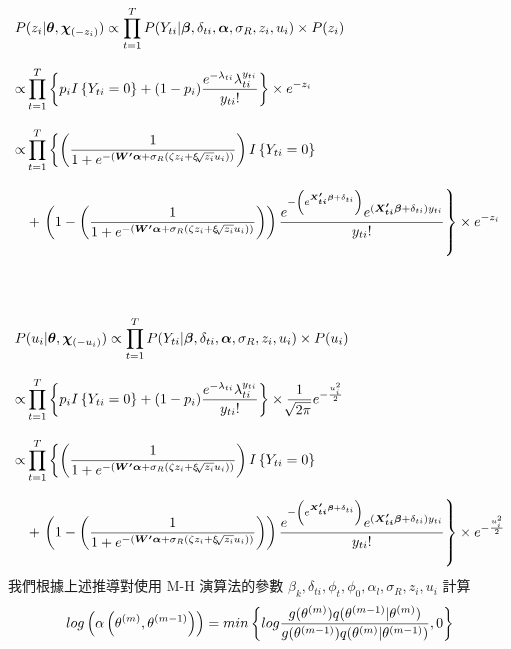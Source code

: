 \documentclass[12pt,a4paper]{article}
\begin{document}
\begin{CJK}{UTF8}{bkai}
\begin{align*}
 P & (z_i|\bm{\theta},\bm{\chi}_{(-z_i)}) \propto \prod_{t=1}^T P(Y_{ti}|\bm{\beta},\delta_{ti},\bm{\alpha},\sigma_R,z_i,u_i) \times P(z_i) \\[3mm]
 \propto &
\prod_{t=1}^T\left\{ p_i I \left\{ Y_{ti} = 0 \right\}+(1-p_i)\frac{e^{-\lambda_{ti}}\lambda_{ti}^{y_{ti}}}{y_{ti}!}\right\} \times e^{-z_i} \\[3mm]
 \propto &
\prod_{t=1}^T \left\{ \left( \frac{1}{1+e^{-(\bm{W^\prime}\bm{\alpha}+\sigma_R(\zeta z_i+\xi \sqrt[]{z_i} u_i))}} \right)I\left\{ Y_{ti} = 0\right\} \right.\\[3mm]
& + \left. \left(1-\left( \frac{1}{1+e^{-(\bm{W^\prime}\bm{\alpha}+\sigma_R(\zeta z_i+\xi \sqrt[]{z_i} u_i))}} \right)\right)\frac{e^{-\left(e^{\bm{X_{ti}^\prime\bm{\beta}}+\delta_{ti}}\right)}e^{(\bm{X_{ti}^\prime\bm{\beta}}+\delta_{ti})y_{ti}}}{y_{ti}!}\right\} \times e^{-z_i}\\[3mm]
\\ \hspace*{\fill} \\
 P & (u_i|\bm{\theta},\bm{\chi}_{(-u_i)}) \propto \prod_{t=1}^T P(Y_{ti}|\bm{\beta},\delta_{ti},\bm{\alpha},\sigma_R,z_i,u_i) \times P(u_i) \\[3mm]
 \propto &
\prod_{t=1}^T\left\{ p_i I \left\{ Y_{ti} = 0 \right\}+(1-p_i)\frac{e^{-\lambda_{ti}}\lambda_{ti}^{y_{ti}}}{y_{ti}!}\right\} \times \frac{1}{\sqrt[]{2\pi}}e^{-\frac{u_i^2}{2}} \\[3mm]
 \propto &
\prod_{t=1}^T \left\{ \left( \frac{1}{1+e^{-(\bm{W^\prime}\bm{\alpha}+\sigma_R(\zeta z_i+\xi \sqrt[]{z_i} u_i))}} \right)I\left\{ Y_{ti} = 0\right\} \right.\\[3mm]
& + \left. \left(1-\left( \frac{1}{1+e^{-(\bm{W^\prime}\bm{\alpha}+\sigma_R(\zeta z_i+\xi \sqrt[]{z_i} u_i))}} \right)\right)\frac{e^{-\left(e^{\bm{X_{ti}^\prime\bm{\beta}}+\delta_{ti}}\right)}e^{(\bm{X_{ti}^\prime\bm{\beta}}+\delta_{ti})y_{ti}}}{y_{ti}!}\right\} \times e^{-\frac{u_i^2}{2}}
 \end{align*}
我們根據上述推導對使用 M-H 演算法的參數 $\beta_k,\delta_{ti},\phi_t,\phi_0,\alpha_l,\sigma_R,z_i,u_i$ 計算
 \begin{align*}
 \setlength\abovedisplayskip{25pt}
 \setlength\belowdisplayskip{25pt}
 log\left(\alpha\left(\theta^{(m)},\theta^{(m-1)}\right)\right) = min \left\{ log\frac{g(\theta^{(m)})q(\theta^{(m-1)}|\theta^{(m)})}{g(\theta^{(m-1)})q(\theta^{(m)}|\theta^{(m-1)})},0 \right\}
\end{align*}
 \begin{align*}

\end{align*}
\end{CJK}
\end{document}
